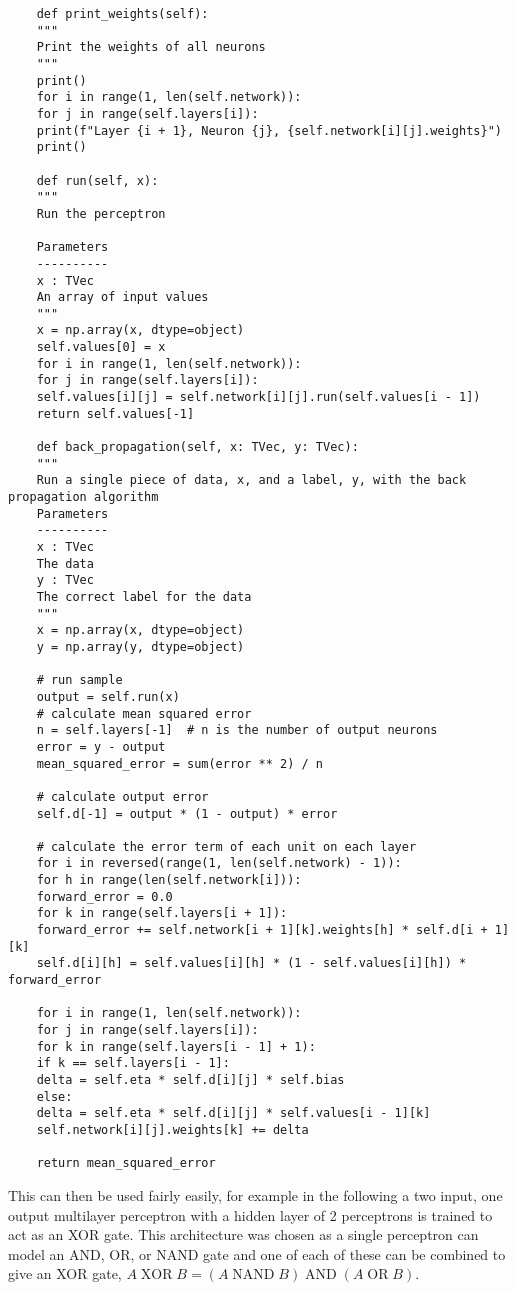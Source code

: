\documentclass[a4paper]{article}
\begin{document}
\begin{lstlisting}
    def print_weights(self):
    """
    Print the weights of all neurons
    """
    print()
    for i in range(1, len(self.network)):
    for j in range(self.layers[i]):
    print(f"Layer {i + 1}, Neuron {j}, {self.network[i][j].weights}")
    print()
    
    def run(self, x):
    """
    Run the perceptron
    
    Parameters
    ----------
    x : TVec
    An array of input values
    """
    x = np.array(x, dtype=object)
    self.values[0] = x
    for i in range(1, len(self.network)):
    for j in range(self.layers[i]):
    self.values[i][j] = self.network[i][j].run(self.values[i - 1])
    return self.values[-1]
    
    def back_propagation(self, x: TVec, y: TVec):
    """
    Run a single piece of data, x, and a label, y, with the back propagation algorithm
    Parameters
    ----------
    x : TVec
    The data
    y : TVec
    The correct label for the data
    """
    x = np.array(x, dtype=object)
    y = np.array(y, dtype=object)
    
    # run sample
    output = self.run(x)
    # calculate mean squared error
    n = self.layers[-1]  # n is the number of output neurons
    error = y - output
    mean_squared_error = sum(error ** 2) / n
    
    # calculate output error
    self.d[-1] = output * (1 - output) * error
    
    # calculate the error term of each unit on each layer
    for i in reversed(range(1, len(self.network) - 1)):
    for h in range(len(self.network[i])):
    forward_error = 0.0
    for k in range(self.layers[i + 1]):
    forward_error += self.network[i + 1][k].weights[h] * self.d[i + 1][k]
    self.d[i][h] = self.values[i][h] * (1 - self.values[i][h]) * forward_error
    
    for i in range(1, len(self.network)):
    for j in range(self.layers[i]):
    for k in range(self.layers[i - 1] + 1):
    if k == self.layers[i - 1]:
    delta = self.eta * self.d[i][j] * self.bias
    else:
    delta = self.eta * self.d[i][j] * self.values[i - 1][k]
    self.network[i][j].weights[k] += delta
    
    return mean_squared_error
    \end{lstlisting}
    This can then be used fairly easily, for example in the following a two input, one output multilayer perceptron with a hidden layer of 2 perceptrons is trained to act as an XOR gate.
    This architecture was chosen as a single perceptron can model an AND, OR, or NAND gate and one of each of these can be combined to give an XOR gate, \(A\mathbin{\operatorname{XOR}}B = (A\mathbin{\operatorname{NAND}} B) \mathbin{\operatorname{AND}} (A \mathbin{\operatorname{OR}} B)\).
\end{document}
